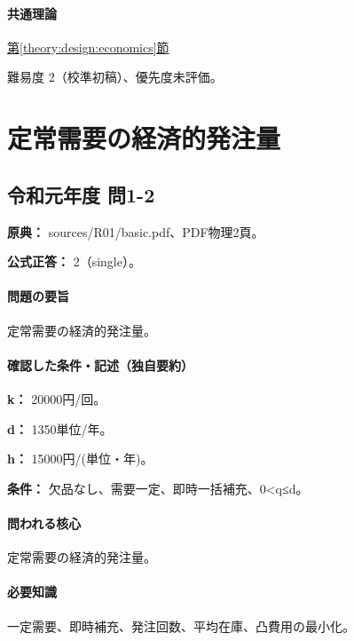 \paragraph{共通理論} \hyperref[theory:design:economics]{第\ref*{theory:design:economics}節}

\par 難易度 2（校準初稿）、優先度未評価。

\section{定常需要の経済的発注量}

\subsection{令和元年度 問1-2}
\label{q:r01-reg-basic-1-2}

\noindent\textbf{原典：} sources/R01/basic.pdf、PDF物理2頁。

\textbf{公式正答：} 2（single）。

\paragraph{問題の要旨} 定常需要の経済的発注量。

\paragraph{確認した条件・記述（独自要約）}\mbox{}\par

\noindent\textbf{k：} 20000円/回。\par

\noindent\textbf{d：} 1350単位/年。\par

\noindent\textbf{h：} 15000円/(単位・年)。\par

\noindent\textbf{条件：} 欠品なし、需要一定、即時一括補充、0<q≤d。\par

\paragraph{問われる核心} 定常需要の経済的発注量。

\paragraph{必要知識} 一定需要、即時補充、発注回数、平均在庫、凸費用の最小化。

